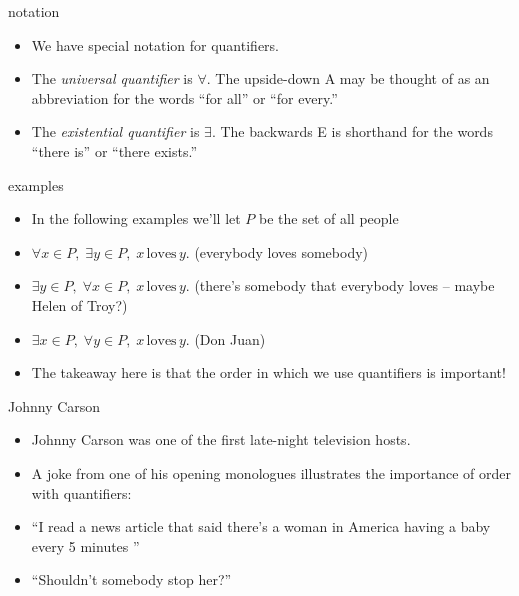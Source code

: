 \documentclass[landscape]{beamer}
\begin{document}
\begin{frame}{notation}
\begin{itemize}
\item We have special notation for quantifiers. \pause
\item The {\em universal quantifier} is $\forall$.  The upside-down A may be thought of as an abbreviation for the words ``for all'' or ``for every.'' \pause
\item The {\em existential quantifier} is $\exists$.  The backwards E is shorthand for the words ``there is'' or ``there exists.'' \pause
\end{itemize}
\end{frame}

\begin{frame}{examples}
\begin{itemize}
\item In the following examples we'll let $P$ be the set of all people\pause
\item \rule{0pt}{24pt} $\displaystyle \forall x \in P, \; \exists y \in P, \; x \, \mbox{loves} \, y$. \newline \pause
(everybody loves somebody) \pause
\item \rule{0pt}{24pt} $\displaystyle \exists y \in P, \; \forall x \in P, \; x \, \mbox{loves} \, y$. \pause \newline
(there's somebody that everybody loves -- maybe Helen of Troy?)\pause

\item \rule{0pt}{24pt} $\displaystyle \exists x \in P, \; \forall y \in P, \; x \, \mbox{loves} \, y$. \newline \pause
(Don Juan\textellipsis) \pause

\item \rule{0pt}{24pt} The takeaway here is that the order in which we use quantifiers is important!
\end{itemize}
\end{frame}

\begin{frame}{Johnny Carson}
\begin{itemize}
\item Johnny Carson was one of the first late-night television hosts. \pause
\item A joke from one of his opening monologues illustrates the importance of order with quantifiers: \pause
\item ``I read a news article that said there's a woman in America having a baby every 5 minutes \textellipsis '' \pause
\item ``Shouldn't somebody stop her?''
\end{itemize}
\end{frame}
\end{document}
